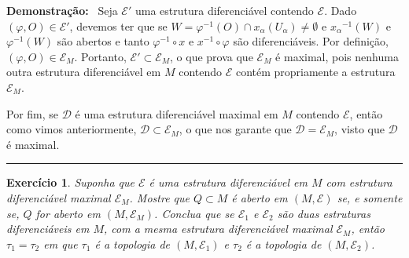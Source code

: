 \documentclass[12pt]{report}
\newtheorem{exer}[theorem]{\color{red} Exercício \color{black}}
\newenvironment{dem}[1][Demonstração]{\textbf{#1:}\ }  {\hfill\rule{1ex}{1ex}}
\newcommand{\oo}{_}
\newcommand{\inv}[1]{\ensuremath{{#1}^{-1}}}
\begin{document}
\begin{dem}
    Seja $\mathcal{E}'$ uma estrutura diferenciável
    contendo $\mathcal{E}$. 
    Dado $(\varphi, O )\in \mathcal{E}'$, devemos ter que se $W = \varphi ^{-1} (O) \cap x \oo\alpha (U \oo \alpha )\neq \emptyset $ e $\inv{x\oo \alpha}(W)$ e $\inv{\varphi} (W)$ são abertos e tanto $\varphi^{-1} \circ x $ e $\inv{x} \circ \varphi$ são diferenciáveis. 
    Por definição, $(\varphi , O) \in \mathcal{E}\oo {M}$.
    Portanto, $\mathcal{E}' \subset \mathcal{E}\oo M$, o que prova que $\mathcal{E}_M$ é maximal, pois nenhuma outra estrutura diferenciável em $M$ contendo $\mathcal{E}$ contém propriamente a estrutura $\mathcal{E}_M$.
    
    Por fim, se $\mathcal{D}$ é uma estrutura diferenciável maximal em $M$ contendo $\mathcal{E}$, então como vimos anteriormente, $\mathcal{D} \subset \mathcal{E}_M$, o que nos garante que $\mathcal{D} = \mathcal{E}_M$, visto que $\mathcal{D}$ é maximal.
    

\end{dem}

\begin{exer}
    Suponha que $\mathcal{E}$ é uma estrutura diferenciável em $M$ com estrutura diferenciável maximal $\mathcal{E} \oo M$.
     Mostre que $Q \subset M$ é aberto em $(M, \mathcal{E})$ se, e somente se, $Q$ for aberto em $(M, \mathcal{E}\oo {M})$. 
     Conclua que se $\mathcal{E}\oo 1$ e $\mathcal{E}  \oo 2$ são duas estruturas diferenciáveis em $M$, com a mesma estrutura diferenciável maximal $\mathcal{E}\oo M$, então $\tau \oo 1  =  \tau \oo 2$ em que $\tau \oo 1$ é a topologia de $(M, \mathcal{E} \oo 1)$ e $\tau \oo 2$ é a topologia de $(M, \mathcal{E}\oo 2)$.
\end{exer}
\end{document}
